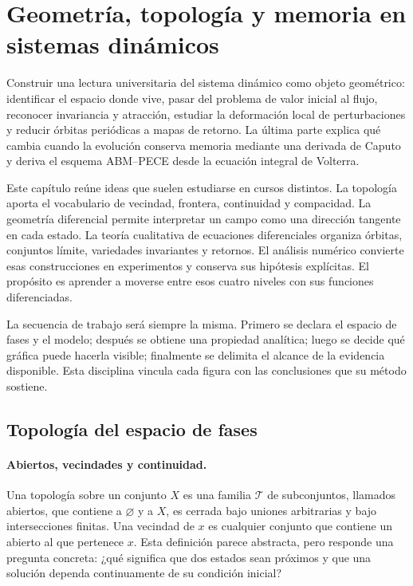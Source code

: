 
\section{Geometría, topología y memoria en sistemas dinámicos}
\label{sec:geometria-topologia-memoria}

\begin{objectivebox}
Construir una lectura universitaria del sistema dinámico como objeto geométrico:
identificar el espacio donde vive, pasar del problema de valor inicial al flujo,
reconocer invariancia y atracción, estudiar la deformación local de perturbaciones y
reducir órbitas periódicas a mapas de retorno. La última parte explica qué cambia
cuando la evolución conserva memoria mediante una derivada de Caputo y deriva el
esquema ABM--PECE desde la ecuación integral de Volterra.
\end{objectivebox}

Este capítulo reúne ideas que suelen estudiarse en cursos distintos. La topología
aporta el vocabulario de vecindad, frontera, continuidad y compacidad. La geometría
diferencial permite interpretar un campo como una dirección tangente en cada estado.
La teoría cualitativa de ecuaciones diferenciales organiza órbitas, conjuntos límite,
variedades invariantes y retornos. El análisis numérico convierte esas construcciones
en experimentos y conserva sus hipótesis explícitas. El propósito es aprender a moverse
entre esos cuatro niveles con sus funciones diferenciadas.

La secuencia de trabajo será siempre la misma. Primero se declara el espacio de
fases y el modelo; después se obtiene una propiedad analítica; luego se decide qué
gráfica puede hacerla visible; finalmente se delimita el alcance de la evidencia disponible.
Esta disciplina vincula cada figura con las conclusiones que su método sostiene.

\subsection{Topología del espacio de fases}

\paragraph{Abiertos, vecindades y continuidad.}
Una topología sobre un conjunto $X$ es una familia $\mathcal T$ de subconjuntos,
llamados abiertos, que contiene a $\varnothing$ y a $X$, es cerrada bajo uniones
arbitrarias y bajo intersecciones finitas. Una vecindad de $x$ es cualquier conjunto
que contiene un abierto al que pertenece $x$. Esta definición parece abstracta, pero
responde una pregunta concreta: ¿qué significa que dos estados sean próximos y que
una solución dependa continuamente de su condición inicial?

